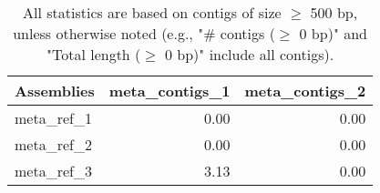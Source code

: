 \documentclass[12pt,a4paper]{article}
\begin{document}
\begin{table}[ht]
\begin{center}
\caption{All statistics are based on contigs of size $\geq$ 500 bp, unless otherwise noted (e.g., "\# contigs ($\geq$ 0 bp)" and "Total length ($\geq$ 0 bp)" include all contigs).}
\begin{tabular}{|l*{2}{|r}|}
\hline
Assemblies & meta\_contigs\_1 & meta\_contigs\_2 \\ \hline
meta\_ref\_1 & 0.00 & 0.00 \\ \hline
meta\_ref\_2 & 0.00 & 0.00 \\ \hline
meta\_ref\_3 & 3.13 & 0.00 \\ \hline
\end{tabular}
\end{center}
\end{table}
\end{document}
